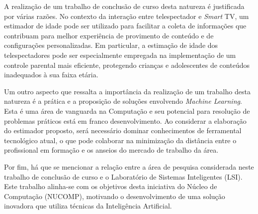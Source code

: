 A realização de um trabalho de conclusão de curso desta natureza é justificada por várias razões. No contexto da interação entre telespectador e \emph{Smart} TV, um estimador de idade pode ser utilizado para facilitar a coleta de informações que contribuam para melhor experiência de provimento de conteúdo e de configurações personalizadas. Em particular, a estimação de idade dos telespectadores pode ser especialmente empregada na implementação de um controle parental mais eficiente, protegendo crianças e adolescentes de conteúdos inadequados à sua faixa etária.

Um outro aspecto que ressalta a importância da realização de um trabalho desta natureza é a prática e a proposição de soluções envolvendo \emph{Machine Learning}. Esta é uma área de vanguarda na Computação e seu potencial para resolução de problemas práticos está em franco desenvolvimento. Ao considerar a elaboração do estimador proposto, será necessário dominar conhecimentos de ferramental tecnológico atual, o que pode colaborar na minimização da distância entre o profissional em formação e os anseios do mercado de trabalho da área.

Por fim, há que se mencionar a relação entre a área de pesquisa considerada neste trabalho de conclusão de curso e o Laboratório de Sistemas Inteligentes (LSI). Este trabalho alinha-se com os objetivos desta iniciativa do Núcleo de Computação (NUCOMP), motivando o desenvolvimento de uma solução inovadora que utiliza técnicas da Inteligência Artificial.
